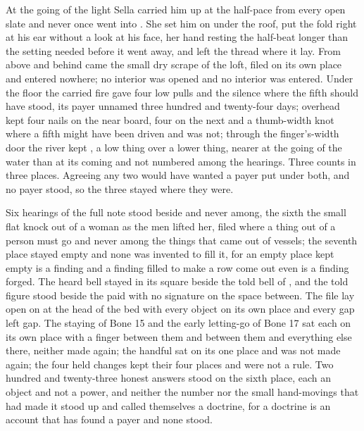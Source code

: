 At the going of the light Sella carried him up at the half-pace from every open slate and never once went into . She set him on  under the roof, put the fold right at his ear without a look at his face, her hand resting the half-beat longer than the setting needed before it went away, and left the thread where it lay. From above and behind came the small dry scrape of the loft, filed on its own place and entered nowhere; no interior was opened and no interior was entered. Under the floor the carried fire gave four low pulls and the silence where the fifth should have stood, its payer unnamed three hundred and twenty-four days; overhead  kept four nails on the near board, four on the next and a thumb-width knot where a fifth might have been driven and was not; through the finger's-width door the river kept , a low thing over a lower thing, nearer at the going of the water than at its coming and not numbered among the hearings. Three counts in three places. Agreeing any two would have wanted a payer put under both, and no payer stood, so the three stayed where they were.

Six hearings of the full note stood beside and never among, the sixth the small flat knock out of a woman as the men lifted her, filed where a thing out of a person must go and never among the things that came out of vessels; the seventh place stayed empty and none was invented to fill it, for an empty place kept empty is a finding and a finding filled to make a row come out even is a finding forged. The heard bell stayed in its square beside the told bell of , and the told figure stood beside the paid with no signature on the space between. The file lay open on  at the head of the bed with every object on its own place and every gap left gap. The staying of Bone 15 and the early letting-go of Bone 17 sat each on its own place with a finger between them and between them and everything else there, neither made again; the handful sat on its one place and was not made again; the four held changes kept their four places and were not a rule. Two hundred and twenty-three honest answers stood on the sixth place, each an object and not a power, and neither the number nor the small hand-movings that had made it stood up and called themselves a doctrine, for a doctrine is an account that has found a payer and none stood.

